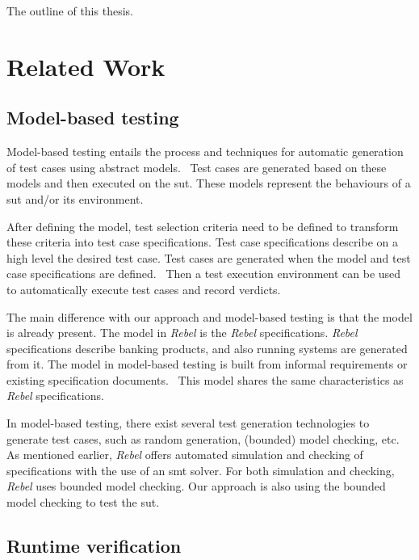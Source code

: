 The outline of this thesis.

\section{Related Work}

\subsection*{Model-based testing}

Model-based testing entails the process and techniques for automatic generation
of test cases using abstract models.~\cite{utting2012taxonomy, tretmans2008model, dalal1999model}
Test cases are generated based on these models and then executed on the
\gls{sut}. These models represent the behaviours of a \gls{sut} and/or its
environment.~\cite{utting2012taxonomy, tretmans2008model}

After defining the model, test selection criteria need to be defined to
transform these criteria into test case specifications. Test case specifications
describe on a high level the desired test case. Test cases are generated when
the model and test case specifications are defined.~\cite{utting2012taxonomy}
Then a test execution environment can be used to automatically execute test
cases and record verdicts.

The main difference with our approach and model-based testing is that the model
is already present. The model in \textit{Rebel} is the \textit{Rebel}
specifications. \textit{Rebel} specifications describe banking products, and
also running systems are generated from it. The model in model-based testing is
built from informal requirements or existing specification
documents.~\cite[p.~2]{utting2012taxonomy} This model
shares the same characteristics as \textit{Rebel} specifications.

In model-based testing, there exist several test generation technologies to
generate test cases, such as random generation, (bounded) model checking,
etc.~\cite[p.~8-9]{utting2012taxonomy}
As mentioned earlier, \textit{Rebel} offers automated simulation and checking of
specifications with the use of an \gls{smt} solver. For both simulation and
checking, \textit{Rebel} uses bounded model checking. Our approach is also using
the bounded model checking to test the \gls{sut}.

\subsection*{Runtime verification}

